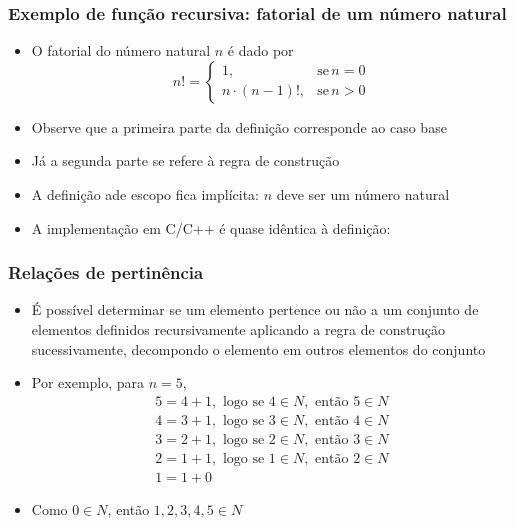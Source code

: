 \begin{frame}
    \frametitle{Exemplo de função recursiva: fatorial de um número natural}

    \begin{itemize}
        \item O fatorial do número natural $n$ é dado por
    $$
    n! = \left\lbrace \begin{array}{ll} 1, & \mbox{se}\, n = 0 \\ n\cdot (n - 1)!, & \mbox{se}\, n > 0 \end{array}\right.
    $$ 
        \item Observe que a primeira parte da definição corresponde ao caso base

        \item Já a segunda parte se refere à regra de construção

        \item A definição ade escopo fica implícita: $n$ deve ser um número natural

        \item A implementação em C/C++ é quase idêntica à definição:


    \end{itemize}
\end{frame}

\begin{frame}
    \frametitle{Relações de pertinência}

    \begin{itemize}
        \item É possível determinar se um elemento {pertence ou não} 
        a um conjunto de elementos definidos recursivamente aplicando a 
        regra de construção {sucessivamente}, {decompondo} o
        elemento em outros elementos do conjunto

        \item Por exemplo, para $n = 5$,
        \[
        \begin{array}{l}
            5 = 4 + 1, \, \, \mbox{logo se}\, \, 4\in N, \, \, \mbox{então}\, \,
            5 \in N \\  
            4 = 3 + 1, \, \, \mbox{logo se}\, \, 3\in N, \, \, \mbox{então}\, \,
            4 \in N \\  
            3 = 2 + 1, \, \, \mbox{logo se}\, \, 2\in N, \, \, \mbox{então}\, \,
            3 \in N \\  
            2 = 1 + 1, \, \, \mbox{logo se}\, \, 1\in N, \, \, \mbox{então}\, \,
            2 \in N \\  
            1 = 1 + 0 
        \end{array}
        \]
        \item Como $0\in N$, então $1, 2, 3, 4,5 \in N$
    \end{itemize}
\end{frame}

